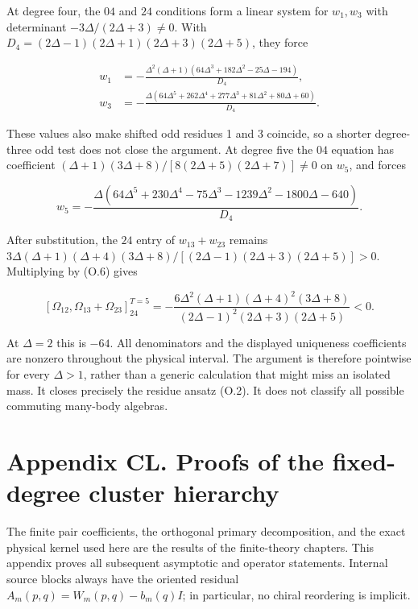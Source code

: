 At degree four, the \(04\) and \(24\) conditions form a linear system for \(w_1,w_3\) with determinant \(-3\Delta/(2\Delta+3)\ne0\). With \(D_4=(2\Delta-1)(2\Delta+1)(2\Delta+3)(2\Delta+5)\), they force

\[
\begin{aligned}
w_1&=-\frac{\Delta^2(\Delta+1)(64\Delta^3+182\Delta^2-25\Delta-194)}{D_4},\\
w_3&=-\frac{\Delta(64\Delta^5+262\Delta^4+277\Delta^3+81\Delta^2+80\Delta+60)}{D_4}.
\end{aligned}
\tag{O.7}
\]

These values also make shifted odd residues 1 and 3 coincide, so a shorter degree-three odd test does not close the argument. At degree five the \(04\) equation has coefficient \((\Delta+1)(3\Delta+8)/[8(2\Delta+5)(2\Delta+7)]\ne0\) on \(w_5\), and forces

\[
w_5=-\frac{\Delta(64\Delta^5+230\Delta^4-75\Delta^3-1239\Delta^2-1800\Delta-640)}{D_4}.
\tag{O.8}
\]

After substitution, the \(24\) entry of \(w_{13}+w_{23}\) remains \(3\Delta(\Delta+1)(\Delta+4)(3\Delta+8)/[(2\Delta-1)(2\Delta+3)(2\Delta+5)]>0\). Multiplying by (O.6) gives

\[
[\Omega_{12},\Omega_{13}+\Omega_{23}]^{T=5}_{24}
=-\frac{6\Delta^2(\Delta+1)(\Delta+4)^2(3\Delta+8)}
{(2\Delta-1)^2(2\Delta+3)(2\Delta+5)}<0.
\tag{O.9}
\]

At \(\Delta=2\) this is \(-64\). All denominators and the displayed uniqueness coefficients are nonzero throughout the physical interval. The argument is therefore pointwise for every \(\Delta>1\), rather than a generic calculation that might miss an isolated mass. It closes precisely the residue ansatz (O.2). It does not classify all possible commuting many-body algebras.

\clearpage
\hypertarget{appendix-cl.-proofs-of-the-fixed-degree-cluster-hierarchy}{%
\section{Appendix CL. Proofs of the fixed-degree cluster hierarchy}\label{appendix-cl.-proofs-of-the-fixed-degree-cluster-hierarchy}}

The finite pair coefficients, the orthogonal primary decomposition, and the exact physical kernel used here are the results of the finite-theory chapters. This appendix proves all subsequent asymptotic and operator statements. Internal source blocks always have the oriented residual \(A_m(p,q)=W_m(p,q)-b_m(q)I\); in particular, no chiral reordering is implicit.

